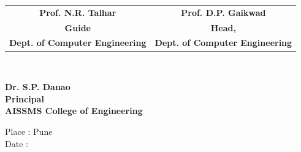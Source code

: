  \vspace{1cm}
 \begin{center}
 
 
\begin{tabular}{c c } 
\bf Prof. N.R. Talhar &\hspace{1cm}\bf Prof. D.P. Gaikwad \\
\bf Guide&\hspace{1cm}\bf Head,\\
\bf Dept. of Computer Engineering &\hspace{1cm} \bf Dept. of Computer Engineering 
\end{tabular}\\
 \end{center}
\vspace{1cm}
\begin{center}
\hspace{10mm}\bf{Dr. S.P. Danao\\\hspace{5mm}Principal\\\hspace{5mm}AISSMS College of Engineering}
\end{center}
\begin{flushleft}
Place : Pune\\
Date  :  
\end{flushleft}
